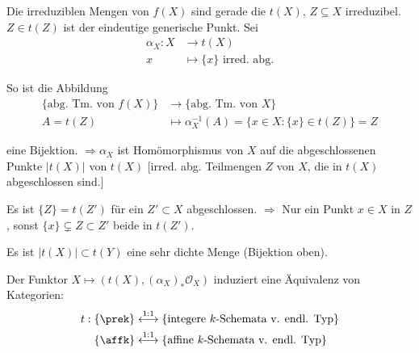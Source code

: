 Die irreduziblen Mengen von $f(X)$ sind gerade die $t(X)$, $Z\subseteq X$
irreduzibel. $Z\in t(Z)$ ist der eindeutige generische Punkt. Sei
\begin{align*}
  \alpha_{X}:X & \longrightarrow t(X)\\
  x & \longmapsto\{x\}\text{ irred. abg.}
\end{align*}

So ist die Abbildung
\begin{align*}
  \text{\{abg. Tm. von }f(X)\} & \longrightarrow\text{\{abg. Tm. von }X\}\\
  A=t(Z) & \longmapsto\alpha_{X}^{-1}(A)=\{x\in X:\{x\}\in t(Z)\}=Z
\end{align*}

eine Bijektion. $\Longrightarrow\alpha_{X}$ ist Homömorphismus von
$X$ auf die abgeschlossenen Punkte $|t(X)|$ von $t(X)$ {[}irred.
abg. Teilmengen $Z$ von $X$, die in $t(X)$ abgeschlossen sind.{]}

Es ist $\{Z\}=t(Z')$ für ein $Z'\subset X$ abgeschlossen. $\Longrightarrow$
Nur ein Punkt $x\in X$ in $Z$, sonst $\{x\}\subsetneq Z\subset Z'$
beide in $t(Z')$.

Es ist $|t(X)|\subset t(Y)$ eine sehr dichte Menge (Bijektion oben).
\begin{thm}[31]
  Der Funktor $X\mapsto(t(X),(\alpha_{X})_{\ast}\mathcal{O}_{X})$
  induziert eine Äquivalenz von Kategorien:
  \begin{align*}
    t:\{\prek\} & \overset{1:1}{\longleftrightarrow}\text{\{integere }k\text{-Schemata v. endl. Typ\}}\\
    \{\affk\} & \overset{1:1}{\longleftrightarrow}\text{\{affine }k\text{-Schemata v. endl. Typ}\}
  \end{align*}
\end{thm}

